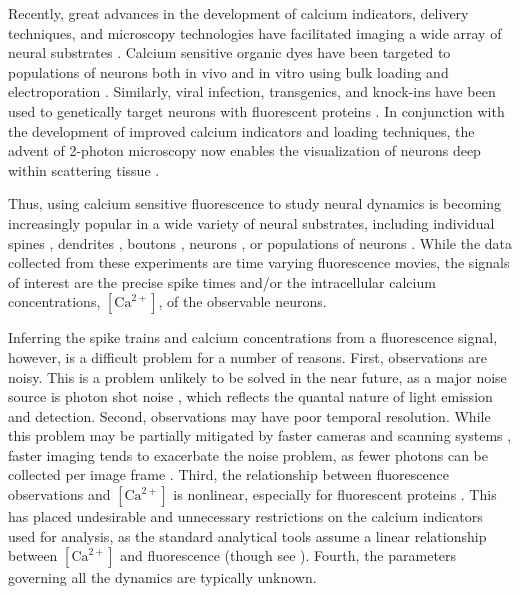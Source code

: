 \documentclass[12pt]{article}
\newcommand{\Ca}{[\text{Ca}^{2+}]}
\begin{document}
Recently, great advances in the development of calcium indicators, delivery techniques, and microscopy technologies have facilitated imaging a wide array of neural substrates \cite{ImagingManual}. Calcium sensitive organic dyes \cite{Tsien81, YusteKatz92} have been targeted to populations of neurons both in vivo and in vitro using bulk loading  \cite{BrusteinKonnerth03, StosiekKonnerth03} and electroporation  \cite{NagayamaChen07, NevianHelmchen07}.  Similarly, viral infection, transgenics, and knock-ins have been used to genetically target neurons with fluorescent proteins \cite{MiyawakiTsien97, GriesbeckTsien01, NakaiImoto01%
} . In conjunction with the development of improved calcium indicators and loading techniques, the advent of 2-photon microscopy now enables the visualization of neurons deep within scattering tissue \cite{DenkWebb90, OheimCharpak01, TheerDenk03, FlusbergSchnitzer05a}.

Thus, using calcium sensitive fluorescence to study neural dynamics is becoming increasingly popular in a wide variety of neural substrates, including individual spines \cite{MullerConnor91, YusteDenk95, EngertBonhoeffer99, NimchinskySvoboda04}, dendrites \cite{MajewskaYuste00, ScheussSvoboda06, SdrullaLinden07}, boutons \cite{MajewskaSur06, BrenowitzRegehr07}, neurons \cite{HelmchenSakmann96, SvobodaDenk96, MaravallSvoboda00}, or populations of neurons \cite{O'MalleyFetcho96, SmettersYuste99, IkegayaYuste04, NiellSmith05, OhkiReid05, OhkiReid06, YaksiFriedrich07, NagayamaChen07, SatoSvoboda07, RootWang07}. While the data collected from these experiments are time varying fluorescence movies, the signals of interest are the precise spike times and/or the intracellular calcium concentrations, $\Ca$, of the observable neurons.

Inferring the spike trains and calcium concentrations from a fluorescence signal, however, is a difficult problem for a number of reasons.  First, observations are noisy.  This is a problem unlikely to be solved in the near future, as a major noise source is photon shot noise \cite{SjulsonMiesenbock07}, which reflects the quantal nature of light emission and detection. Second, observations may have poor temporal resolution.  While this problem may be partially mitigated by faster cameras and scanning systems \cite{FlusbergSchnitzer05a,FanEllisman99, NguyenParker01, IyerSaggau06}, faster imaging tends to exacerbate the noise problem, as fewer photons can be collected per image frame \cite{SjulsonMiesenbock07}.  Third, the relationship between fluorescence observations and $\Ca$ is nonlinear, especially for fluorescent proteins \cite{PologrutoSvoboda04, TayYue07}.  This has placed undesirable and unnecessary restrictions on the calcium indicators used for analysis, as the standard analytical tools assume a linear relationship between $\Ca$ and fluorescence \cite{YasudaSvoboda04, ReiffBorst05, SjulsonMiesenbock07} (though see \cite{BorstAbarbanel07}). Fourth, the parameters governing all the dynamics are typically unknown.
\end{document}
